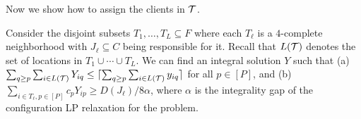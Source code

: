 \noindent
Now we show how to assign the clients in ${\cal T}$. 
\begin{lemma}\label{lem:rounding-local-neighborhoods}
Consider the disjoint subsets $T_1,\ldots,T_L \subseteq F$ where each $T_\ell$ is a $4$-complete neighborhood with $J_\ell\subseteq C$ 
being responsible for it. Recall that $L({\cal T})$ denotes the set of locations in $T_1 \cup \cdots \cup T_L$. 
We can find an integral solution $Y$ such that
 (a) $\sum_{q\geq p} \sum_{i\in L({\cal T})} Y_{iq} \leq \lceil\sum_{q\geq p} \sum_{i\in L({\cal T})} y_{iq}\rceil$ for all $p\in [P]$, and
 (b) $\sum_{i\in T_\ell,p\in [P]} c_p Y_{ip} \geq D(J_\ell)/8\alpha$, where $\alpha$ is the integrality gap of the configuration LP relaxation for
 the \cckp problem. 
\end{lemma}
